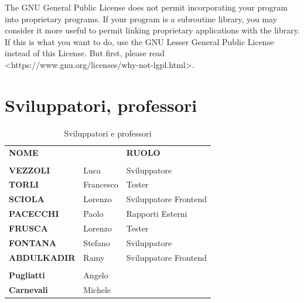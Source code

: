 \documentclass[11pt]{book}
\begin{document}
    The GNU General Public License does not permit incorporating your program
    into proprietary programs.  If your program is a subroutine library, you
    may consider it more useful to permit linking proprietary applications with
    the library.  If this is what you want to do, use the GNU Lesser General
    Public License instead of this License.  But first, please read
    <https://www.gnu.org/licenses/why-not-lgpl.html>.

    \listoftables

    \listoffigures

    \begin{table}[]
        \caption{Sviluppatori e professori}
        \chapter*{Sviluppatori, professori}
        \begin{tabular}{lll}
            \textbf{NOME} & & \textbf{RUOLO} & \\ \cline{1-3} \\
            \textbf{VEZZOLI} & Luca & Sviluppatore\\
            \textbf{TORLI} & Francesco & Tester\\
            \textbf{SCIOLA} & Lorenzo & Sviluppatore Frontend\\
            \textbf{PACECCHI} & Paolo & Rapporti Esterni\\
            \textbf{FRUSCA} & Lorenzo & Tester\\
            \textbf{FONTANA} & Stefano & Sviluppatore\\
            \textbf{ABDULKADIR} & Ramy & Sviluppatore Frontend\\
            \\
            \textbf{Pugliatti} & Angelo &\\
            \textbf{Carnevali} & Michele &\\
        \end{tabular}
    \end{table}
\end{document}
